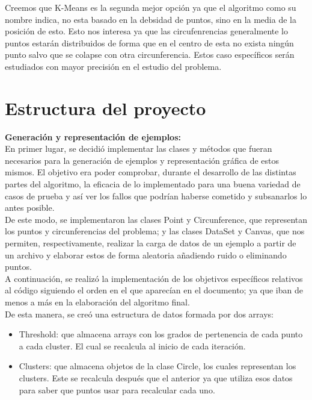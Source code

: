 \documentclass[conference,a4paper]{IEEEtran}
\begin{document}
Creemos que K-Means es la segunda mejor opción ya que el algoritmo como su nombre indica, no esta basado en la debsidad de puntos, sino en la media de la posición de esto. Esto nos interesa ya que las circufenrencias generalmente lo puntos estarán distribuidos de forma que en el centro de esta no exista ningún punto salvo que se colapse con otra circunferencia. Estos caso específicos serán estudiados con mayor precisión en el estudio del problema.\\

\clearpage


\section{Estructura del proyecto}

\textbf{Generación y representación de ejemplos:}\\

En primer lugar, se decidió implementar las clases y métodos que fueran necesarios para la generación de ejemplos y representación gráfica de estos mismos. El objetivo era poder comprobar, durante el desarrollo de las distintas partes del algoritmo, la eficacia de lo implementado para una buena variedad de casos de prueba y así ver los fallos que podrían haberse cometido y subsanarlos lo antes posible. \\
De este modo, se implementaron las clases Point y Circunference, que representan los puntos y circunferencias del problema; y las clases DataSet y Canvas, que nos permiten, respectivamente, realizar la carga de datos de un ejemplo a partir de un archivo y elaborar estos de forma aleatoria añadiendo ruido o eliminando puntos.\\

A continuación, se realizó la implementación de los objetivos específicos relativos al código siguiendo el orden en el que aparecían en el documento; ya que iban de menos a más en la elaboración del algoritmo final.\\ 

De esta manera, se creó una estructura de datos formada por dos arrays: 
\begin{itemize}
	\item Threshold: que almacena arrays con los grados de pertenencia de cada punto a cada cluster. El cual se recalcula al inicio de cada iteración.
	\item Clusters: que almacena objetos de la clase Circle, los cuales representan los clusters. Este se recalcula después que el anterior ya que utiliza esos datos para saber que puntos usar para recalcular cada uno.\\
\end{itemize}
\end{document}
